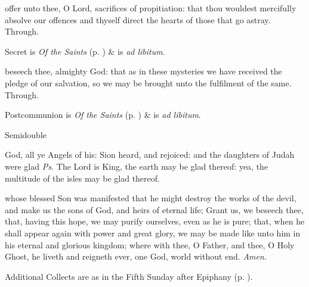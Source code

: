 \secret
{} offer unto thee, O Lord, sacrifices of propitiation: that thou wouldest mercifully absolve our offences and thyself direct the hearts of those that go astray. Through.
\begin{rubric}
     Secret is \emph{Of the Saints} (p. \pageref{SPSaints}) \&  is \emph{ad libitum}.
\end{rubric}
\postcommunion
{} beseech thee, almighty God: that as in these mysteries we have received the pledge of our salvation, so we may be brought unto the fulfilment of the same. Through.
\begin{rubric}
     Postcommunion is \emph{Of the Saints} (p. \pageref{SPSaints}) \&  is \emph{ad libitum}.
\end{rubric}


\begin{inhead}
{Semidouble}
\end{inhead}
\par\noindent
{}


\introit
{} God, all ye Angels of his: Sion heard, and rejoiced: and the daughters of Judah were glad \textit{Ps.} The Lord is King, the earth may be glad thereof: yea, the multitude of the isles may be glad thereof.

\collect
{} whose blessed Son was manifested that he might destroy the works of the devil, and make us the sons of God, and heirs of eternal life; Grant us, we beseech thee, that, having this hope, we may purify ourselves, even as he is pure; that, when he shall appear again with power and great glory, we may be made like unto him in his eternal and glorious kingdom; where with thee, O Father, and thee, O Holy Ghost, he liveth and reigneth ever, one God, world without end. \textit{Amen.}
\begin{rubric}
    Additional Collects are as in the Fifth Sunday after Epiphany (p. \pageref{EpiphanyV}).
\end{rubric}

